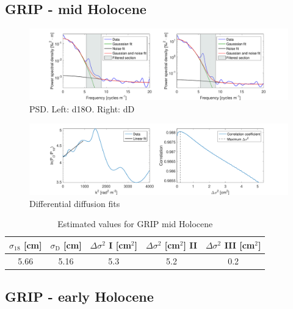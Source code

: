 \documentclass[11pt, draftcls, onecolumn]{IEEEtran} %
\numberwithin{equation}{section}
\numberwithin{table}{section}
\numberwithin{figure}{section}
\begin{document}
\begin{appendices}
\clearpage
\subsection{GRIP - mid Holocene}

\begin{figure}[H]
	\vspace*{2mm}
	\begin{center}
		\includegraphics[width=1\textwidth]{Figure_21}
		\caption{PSD. Left: d18O. Right: dD}  \label{fig:GRIP_mid_fig_1}
	\end{center}
\end{figure}

\begin{figure}[H]
	\vspace*{2mm}
	\begin{center}
		\includegraphics[width=1\textwidth]{Figure_22}
		\caption{Differential diffusion fits}  \label{fig:GRIP_mid_fig_2}
	\end{center}
\end{figure}

\begin{table}[H]
	\center
	\caption{Estimated values for GRIP mid Holocene}
	\label{GRIP_mid_holo}
	\begin{tabular}{c c c c c} 
		\toprule
		$\sigma_{18}$ [cm] & $\sigma_\mathrm{D}$ [cm] & $\Delta\sigma^2$ I [cm$^2$] & $\Delta\sigma^2$ [cm$^2$] II & $\Delta\sigma^2$ III [cm$^2$] \\
		\midrule
		5.66 &   5.16 &     5.3 &     5.2 &     0.2 \\
		\bottomrule		
	\end{tabular}
\end{table}

\clearpage
\subsection{GRIP - early Holocene}


\end{appendices}
\end{document}
